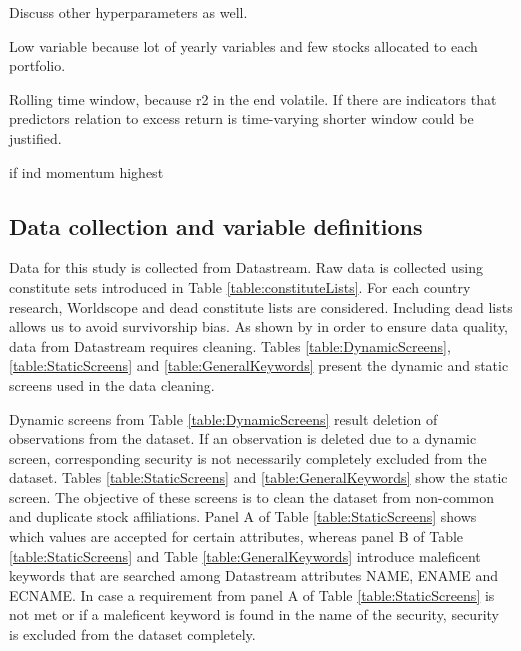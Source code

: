 \documentclass[12pt]{article}
\begin{document}
Discuss other hyperparameters as well.

Low variable because lot of yearly variables and few stocks allocated to each portfolio.

Rolling time window, because r2 in the end volatile. If there are indicators that predictors relation to excess return is time-varying shorter window could be justified.

\citeyearpar{Moskowitz1999} if ind momentum highest 

\clearpage

\begin{appendices}
\section{Data collection and variable definitions}
\renewcommand{\thefigure}{A.\arabic{figure}}
\setcounter{figure}{0}
\renewcommand{\thetable}{A.\arabic{table}}
\setcounter{table}{0}

Data for this study is collected from Datastream. Raw data is collected using constitute sets introduced in Table \ref{table:constituteLists}. For each country research, Worldscope and dead constitute lists are considered. Including dead lists allows us to avoid survivorship bias. As shown by \citet{Ince2006} in order to ensure data quality, data from Datastream requires cleaning. Tables \ref{table:DynamicScreens}, \ref{table:StaticScreens} and \ref{table:GeneralKeywords} present the dynamic and static screens used in the data cleaning. \par

Dynamic screens from Table \ref{table:DynamicScreens} result deletion of observations from the dataset. If an observation is deleted due to a dynamic screen, corresponding security is not necessarily completely excluded from the dataset. Tables \ref{table:StaticScreens} and \ref{table:GeneralKeywords} show the static screen. The objective of these screens is to clean the dataset from non-common and duplicate stock affiliations. Panel A of Table \ref{table:StaticScreens} shows which values are accepted for certain attributes, whereas panel B of Table \ref{table:StaticScreens} and Table \ref{table:GeneralKeywords} introduce maleficent keywords that are searched among Datastream attributes NAME, ENAME and ECNAME. In case a requirement from panel A of Table \ref{table:StaticScreens} is not met or if a maleficent keyword is found in the name of the security, security is excluded from the dataset completely. \par


\end{appendices}
\end{document}
